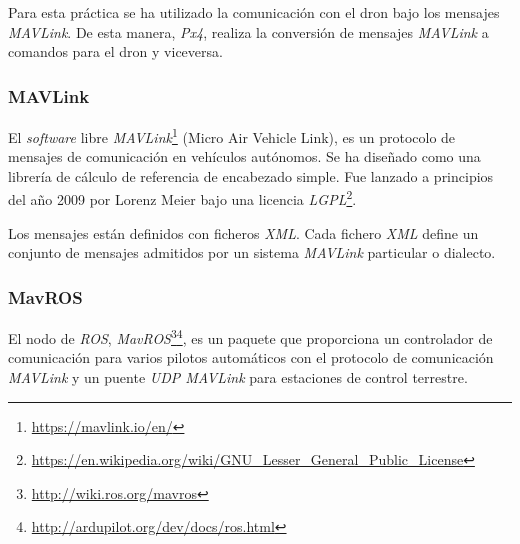 Para esta práctica se ha utilizado la comunicación con el dron bajo los mensajes \textit{MAVLink}. De esta manera, \textit{Px4}, realiza la conversión de mensajes \textit{MAVLink} a comandos para el dron y viceversa.

\subsubsection{MAVLink}
El \textit{software} libre \textit{MAVLink}\footnote{\url{https://mavlink.io/en/}} (Micro Air Vehicle Link), es un protocolo de mensajes de comunicación en vehículos autónomos. Se ha diseñado como una librería de cálculo de referencia de encabezado simple. Fue lanzado a principios del año 2009 por Lorenz Meier bajo una licencia \textit{LGPL}\footnote{\url{https://en.wikipedia.org/wiki/GNU_Lesser_General_Public_License}}.

Los mensajes están definidos con ficheros \textit{XML}. Cada fichero \textit{XML} define un conjunto de mensajes admitidos por un sistema \textit{MAVLink} particular o dialecto.

\subsubsection{MavROS}
El nodo de \textit{ROS}, \textit{MavROS}\footnote{\url{http://wiki.ros.org/mavros}}\footnote{\url{http://ardupilot.org/dev/docs/ros.html}}, es un paquete que proporciona un controlador de comunicación para varios pilotos automáticos con el protocolo de comunicación \textit{MAVLink} y un puente \textit{UDP MAVLink} para estaciones de control terrestre.


